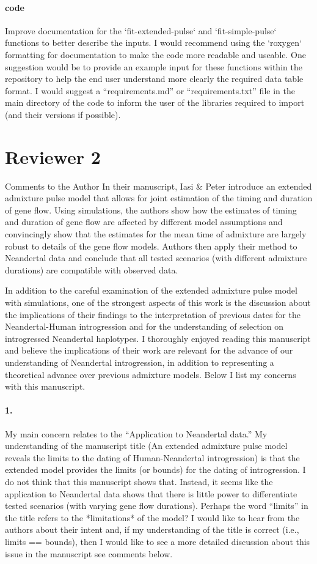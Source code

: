 \documentclass[11pt]{article}
\let\oldparagraph\paragraph
\renewcommand{\paragraph}[1]{\oldparagraph{#1}\mbox{}}
\begin{document}
\paragraph{code}
Improve documentation for the `fit-extended-pulse` and `fit-simple-pulse` functions to better describe the inputs. I would recommend using the `roxygen` formatting for documentation to make the code more readable and useable. 
One suggestion would be to provide an example input for these functions within the repository to help the end user understand more clearly the required data table format. 
I would suggest a “requirements.md” or “requirements.txt” file in the main directory of the code to inform the user of the libraries required to import (and their versions if possible).

\section{Reviewer 2}\label{Reviewer 2}
Comments to the Author
In their manuscript, Iasi & Peter introduce an extended admixture pulse model that allows for joint estimation of the timing and duration of gene flow. Using simulations, the authors show how the estimates of timing and duration of gene flow are affected by different model assumptions and convincingly show that the estimates for the mean time of admixture are largely robust to details of the gene flow models. Authors then apply their method to Neandertal data and conclude that all tested scenarios (with different admixture durations) are compatible with observed data.

In addition to the careful examination of the extended admixture pulse model with simulations, one of the strongest aspects of this work is the discussion about the implications of their findings to the interpretation of previous dates for the Neandertal-Human introgression and for the understanding of selection on introgressed Neandertal haplotypes. I thoroughly enjoyed reading this manuscript and believe the implications of their work are relevant for the advance of our understanding of Neandertal introgression, in addition to representing a theoretical advance over previous admixture models. Below I list my concerns with this manuscript. 

\paragraph{1.}
My main concern relates to the “Application to Neandertal data.” My understanding of the manuscript title (An extended admixture pulse model reveals the limits to the dating of Human-Neandertal introgression) is that the extended model provides the limits (or bounds) for the dating of introgression. I do not think that this manuscript shows that. Instead, it seems like the application to Neandertal data shows that there is little power to differentiate tested scenarios (with varying gene flow durations). Perhaps the word “limits” in the title refers to the *limitations* of the model? I would like to hear from the authors about their intent and, if my understanding of the title is correct (i.e., limits == bounds), then I would like to see a more detailed discussion about this issue in the manuscript see comments below.
\end{document}
